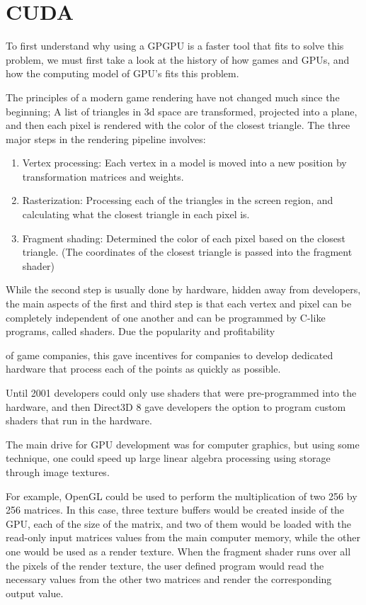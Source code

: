 \documentclass[12pt]{report}
\begin{document}
\section{CUDA}

To first understand why using a GPGPU is a faster tool that fits to solve this problem, we must first take a look at the history of how games and GPUs, and how the computing model of GPU’s fits this problem.

The principles of a modern game rendering have not changed much since the beginning; A list of triangles in 3d space are transformed, projected into a plane, and then each pixel is rendered with the color of the closest triangle. The three major steps in the rendering pipeline involves:

\begin{enumerate}
\item Vertex processing: Each vertex in a model is moved into a new position by transformation matrices and weights.
\item Rasterization: Processing each of the triangles in the screen region, and calculating what the closest triangle in each pixel is.
\item Fragment shading: Determined the color of each pixel based on the closest triangle. (The coordinates of the closest triangle is passed into the fragment shader)
\end{enumerate}

While the second step is usually done by hardware, hidden away from developers, the main aspects of the first and third step is that each vertex and pixel can be completely independent of one another and can be programmed by C-like programs, called shaders. Due the popularity and profitability

of game companies, this gave incentives for companies to develop dedicated hardware that process each of the points as quickly as possible.

Until 2001 developers could only use shaders that were pre-programmed into the hardware, and then Direct3D 8 \cite{wiki:direct3d} gave developers the option to program custom shaders that run in the hardware.

The main drive for GPU development was for computer graphics, but using some technique, one could speed up large linear algebra processing using storage through image textures. \cite{Goeddeke:2005:GBM}

For example, OpenGL could be used to perform the multiplication of two 256 by 256 matrices. In this case, three texture buffers would be created inside of the GPU, each of the size of the matrix, and two of them would be loaded with the read-only input matrices values from the main computer memory, while the other one would be used as a render texture. When the fragment shader runs over all the pixels of the render texture, the user defined program would read the necessary values from the other two matrices and render the corresponding output value. 
\end{document}
